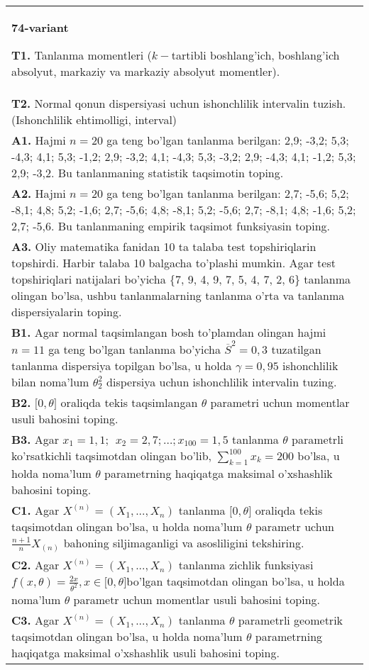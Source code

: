 \documentclass{article}
\begin{document}
\vspace{1cm}


\begin{tabular}{m{17cm}}
\textbf{74-variant}
\newline

\textbf{T1.} 
Tanlanma momentleri (\(k -\)tartibli boshlang'ich, boshlang'ich absolyut, markaziy va markaziy absolyut momentler).
\\
\textbf{T2.} 
Normal qonun dispersiyasi uchun ishonchlilik intervalin tuzish. (Ishonchlilik ehtimolligi, interval)
\\
\textbf{A1.} 
Hajmi \(n = 20\) ga teng bo'lgan tanlanma berilgan: 2,9; -3,2; 5,3; -4,3; 4,1; 5,3; -1,2; 2,9; -3,2; 4,1; -4,3; 5,3; -3,2; 2,9; -4,3; 4,1; -1,2; 5,3; 2,9; -3,2. Bu tanlanmaning statistik taqsimotin toping.
\\
\textbf{A2.} 
Hajmi \(n = 20\) ga teng bo'lgan tanlanma berilgan: 2,7; -5,6; 5,2; -8,1; 4,8; 5,2; -1,6; 2,7; -5,6; 4,8; -8,1; 5,2; -5,6; 2,7; -8,1; 4,8; -1,6; 5,2; 2,7; -5,6. Bu tanlanmaning empirik taqsimot funksiyasin toping.
\\
\textbf{A3.} 
Oliy matematika fanidan 10 ta talaba test topshiriqlarin topshirdi. Harbir talaba 10 balgacha to'plashi mumkin. Agar test topshiriqlari natijalari bo'yicha \{7, 9, 4, 9, 7, 5, 4, 7, 2, 6\} tanlanma olingan bo'lsa, ushbu tanlanmalarning tanlanma o'rta va tanlanma dispersiyalarin toping.
\\
\textbf{B1.} 
Agar normal taqsimlangan bosh to'plamdan olingan hajmi \(n = 11\) ga teng bo'lgan tanlanma bo'yicha \({\overline{S}}^{2} = 0,3\) tuzatilgan tanlanma dispersiya topilgan bo'lsa, u holda \(\gamma = 0,95\) ishonchlilik bilan noma'lum \(\theta_{2}^{2}\) dispersiya uchun ishonchlilik intervalin tuzing.
\\
\textbf{B2.} 
\(\lbrack 0,\theta\rbrack\) oraliqda tekis taqsimlangan \(\theta\) parametri uchun momentlar usuli bahosini toping.
\\
\textbf{B3.} 
Agar \(x_{1} = 1,1;\ \ x_{2} = 2,7;\ldots;x_{100} = 1,5\) tanlanma \(\theta\) parametrli ko'rsatkichli taqsimotdan olingan bo'lib, \(\sum_{k = 1}^{100}x_{k} = 200\) bo'lsa, u holda noma'lum \(\theta\) parametrning haqiqatga maksimal o'xshashlik bahosini toping.
\\
\textbf{C1.} 
Agar \(X^{(n)} = \left( X_{1},...,X_{n} \right)\) tanlanma \(\lbrack 0,\theta\rbrack\) oraliqda tekis taqsimotdan olingan bo'lsa, u holda noma'lum \(\theta\) parametr uchun \(\frac{n + 1}{n}X_{(n)}\) bahoning siljimaganligi va asosliligini tekshiring.
\\
\textbf{C2.} 
Agar \(X^{(n)} = \left( X_{1},...,X_{n} \right)\) tanlanma zichlik funksiyasi\(f(x,\theta) = \frac{2x}{\theta^{2}},x \in \lbrack 0,\theta\rbrack\)bo'lgan taqsimotdan olingan bo'lsa, u holda noma'lum \(\theta\) parametr uchun momentlar usuli bahosini toping.
\\
\textbf{C3.} 
Agar \(X^{(n)} = \left( X_{1},...,X_{n} \right)\) tanlanma \(\theta\) parametrli geometrik taqsimotdan olingan bo'lsa, u holda noma'lum \(\theta\) parametrning haqiqatga maksimal o'xshashlik usuli bahosini toping.
\\

\end{tabular}
\end{document}
